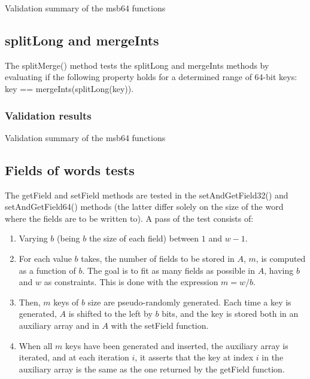 \begin{table}[H]
\centering

\caption{Validation summary of the {\ttfamily msb64} functions}
\label{tab:msb64Validation}
\end{table}



\subsection{{\ttfamily splitLong} and {\ttfamily mergeInts}}

The {\ttfamily splitMerge()} method tests the {\ttfamily splitLong} and {\ttfamily mergeInts} methods by evaluating if the following property holds for a determined range of 64-bit keys: {\ttfamily key == mergeInts(splitLong(key))}.

\subsubsection{Validation results}

\begin{table}[H]
\centering

\caption{Validation summary of the {\ttfamily msb64} functions}
\label{tab:splitMergeValidation}
\end{table}

\subsection{Fields of words tests}
The {\ttfamily getField} and {\ttfamily setField} methods are tested in the {\ttfamily setAndGetField32()} and {\ttfamily setAndGetField64()} methods (the latter differ solely on the size of the word where the fields are to be written to). A pass of the test consists of:
\begin{enumerate}
    \item
    Varying $b$ (being $b$ the size of each field) between $1$ and $w - 1$.
    
    \item
    For each value $b$ takes, the number of fields to be stored in $A$, $m$, is computed as a function of $b$. The goal is to fit as many fields as possible in $A$, having $b$ and $w$ as constraints. This is done with the expression $m = w / b$.
    
    \item
    Then, $m$ keys of $b$ size are pseudo-randomly generated. Each time a key is generated, $A$ is shifted to the left by $b$ bits, and the key is stored both in an auxiliary array and in $A$ with the {\ttfamily setField} function. 
    
    \item
    When all $m$ keys have been generated and inserted, the auxiliary array is iterated, and at each iteration $i$, it asserts that the key at index $i$ in the auxiliary array is the same as the one returned by the {\ttfamily getField} function.
\end{enumerate}

